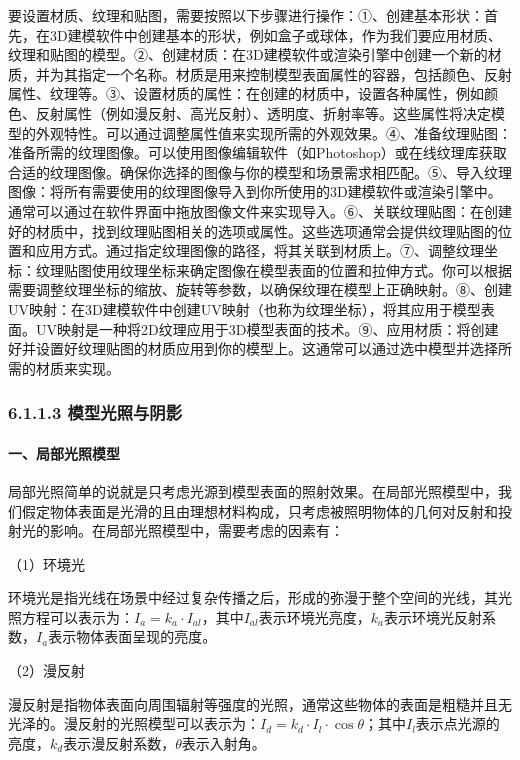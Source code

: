 要设置材质、纹理和贴图，需要按照以下步骤进行操作：①、创建基本形状：首先，在3D建模软件中创建基本的形状，例如盒子或球体，作为我们要应用材质、纹理和贴图的模型。②、创建材质：在3D建模软件或渲染引擎中创建一个新的材质，并为其指定一个名称。材质是用来控制模型表面属性的容器，包括颜色、反射属性、纹理等。③、设置材质的属性：在创建的材质中，设置各种属性，例如颜色、反射属性（例如漫反射、高光反射）、透明度、折射率等。这些属性将决定模型的外观特性。可以通过调整属性值来实现所需的外观效果。④、准备纹理贴图：准备所需的纹理图像。可以使用图像编辑软件（如Photoshop）或在线纹理库获取合适的纹理图像。确保你选择的图像与你的模型和场景需求相匹配。⑤、导入纹理图像：将所有需要使用的纹理图像导入到你所使用的3D建模软件或渲染引擎中。通常可以通过在软件界面中拖放图像文件来实现导入。⑥、关联纹理贴图：在创建好的材质中，找到纹理贴图相关的选项或属性。这些选项通常会提供纹理贴图的位置和应用方式。通过指定纹理图像的路径，将其关联到材质上。⑦、调整纹理坐标：纹理贴图使用纹理坐标来确定图像在模型表面的位置和拉伸方式。你可以根据需要调整纹理坐标的缩放、旋转等参数，以确保纹理在模型上正确映射。⑧、创建UV映射：在3D建模软件中创建UV映射（也称为纹理坐标），将其应用于模型表面。UV映射是一种将2D纹理应用于3D模型表面的技术。⑨、应用材质：将创建好并设置好纹理贴图的材质应用到你的模型上。这通常可以通过选中模型并选择所需的材质来实现。

\subsubsection{6.1.1.3
模型光照与阴影}\label{ux6a21ux578bux5149ux7167ux4e0eux9634ux5f71}

\paragraph{一、局部光照模型}\label{ux4e00ux5c40ux90e8ux5149ux7167ux6a21ux578b}

局部光照简单的说就是只考虑光源到模型表面的照射效果。在局部光照模型中，我们假定物体表面是光滑的且由理想材料构成，只考虑被照明物体的几何对反射和投射光的影响。在局部光照模型中，需要考虑的因素有：

（1）环境光

环境光是指光线在场景中经过复杂传播之后，形成的弥漫于整个空间的光线，其光照方程可以表示为：\(I_a = k_a \cdot I_{al}\)，其中\(I_{al}\)表示环境光亮度，\(k_a\)表示环境光反射系数，\(I_a\)表示物体表面呈现的亮度。

（2）漫反射

漫反射是指物体表面向周围辐射等强度的光照，通常这些物体的表面是粗糙并且无光泽的。漫反射的光照模型可以表示为：\(I_d = k_d \cdot I_l \cdot \cos\theta\)；其中\(I_l\)表示点光源的亮度，\(k_d\)表示漫反射系数，\(\theta\)表示入射角。

